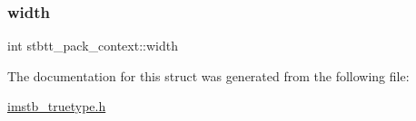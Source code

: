\mbox{\label{structstbtt__pack__context_a5da0b7b5d3b82d5fc75ea1c8945183fa}} 
\subsubsection{\texorpdfstring{width}{width}}
{\footnotesize\ttfamily int stbtt\+\_\+pack\+\_\+context\+::width}



The documentation for this struct was generated from the following file\+:\begin{DoxyCompactItemize}
\item 
\mbox{\hyperlink{imstb__truetype_8h}{imstb\+\_\+truetype.\+h}}\end{DoxyCompactItemize}
